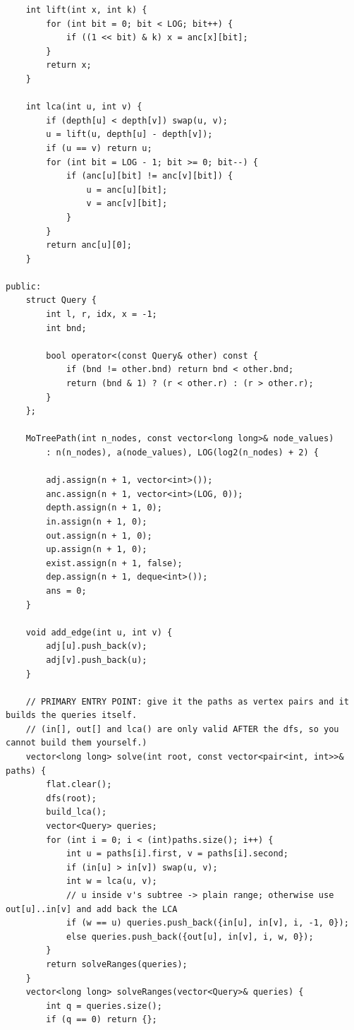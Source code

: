 \documentclass[9pt,a4paper,twocolumn]{extarticle}
\begin{document}
\begin{lstlisting}
    int lift(int x, int k) {
        for (int bit = 0; bit < LOG; bit++) {
            if ((1 << bit) & k) x = anc[x][bit];
        }
        return x;
    }

    int lca(int u, int v) {
        if (depth[u] < depth[v]) swap(u, v);
        u = lift(u, depth[u] - depth[v]);
        if (u == v) return u;
        for (int bit = LOG - 1; bit >= 0; bit--) {
            if (anc[u][bit] != anc[v][bit]) {
                u = anc[u][bit];
                v = anc[v][bit];
            }
        }
        return anc[u][0];
    }

public:
    struct Query {
        int l, r, idx, x = -1;
        int bnd;

        bool operator<(const Query& other) const {
            if (bnd != other.bnd) return bnd < other.bnd;
            return (bnd & 1) ? (r < other.r) : (r > other.r);
        }
    };

    MoTreePath(int n_nodes, const vector<long long>& node_values) 
        : n(n_nodes), a(node_values), LOG(log2(n_nodes) + 2) {
        
        adj.assign(n + 1, vector<int>());
        anc.assign(n + 1, vector<int>(LOG, 0));
        depth.assign(n + 1, 0);
        in.assign(n + 1, 0);
        out.assign(n + 1, 0);
        up.assign(n + 1, 0);
        exist.assign(n + 1, false);
        dep.assign(n + 1, deque<int>());
        ans = 0;
    }

    void add_edge(int u, int v) {
        adj[u].push_back(v);
        adj[v].push_back(u);
    }

    // PRIMARY ENTRY POINT: give it the paths as vertex pairs and it builds the queries itself.
    // (in[], out[] and lca() are only valid AFTER the dfs, so you cannot build them yourself.)
    vector<long long> solve(int root, const vector<pair<int, int>>& paths) {
        flat.clear();
        dfs(root);
        build_lca();
        vector<Query> queries;
        for (int i = 0; i < (int)paths.size(); i++) {
            int u = paths[i].first, v = paths[i].second;
            if (in[u] > in[v]) swap(u, v);
            int w = lca(u, v);
            // u inside v's subtree -> plain range; otherwise use out[u]..in[v] and add back the LCA
            if (w == u) queries.push_back({in[u], in[v], i, -1, 0});
            else queries.push_back({out[u], in[v], i, w, 0});
        }
        return solveRanges(queries);
    }
    vector<long long> solveRanges(vector<Query>& queries) {
        int q = queries.size();
        if (q == 0) return {};
        

\end{lstlisting}
\end{document}
